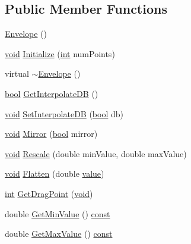 \subsection*{Public Member Functions}
\begin{DoxyCompactItemize}
\item 
\hyperlink{class_envelope_ac609dfa5fe79dd719530e8c29bb35725}{Envelope} ()
\item 
\hyperlink{sound_8c_ae35f5844602719cf66324f4de2a658b3}{void} \hyperlink{class_envelope_a558e8ecaf782edcef59c43fbb99e5235}{Initialize} (\hyperlink{xmltok_8h_a5a0d4a5641ce434f1d23533f2b2e6653}{int} num\+Points)
\item 
virtual \hyperlink{class_envelope_a0d854766d1fc084d27ddb7b6cf7967af}{$\sim$\+Envelope} ()
\item 
\hyperlink{mac_2config_2i386_2lib-src_2libsoxr_2soxr-config_8h_abb452686968e48b67397da5f97445f5b}{bool} \hyperlink{class_envelope_abd472dcf0eb0f885452a0cad1dae0696}{Get\+Interpolate\+DB} ()
\item 
\hyperlink{sound_8c_ae35f5844602719cf66324f4de2a658b3}{void} \hyperlink{class_envelope_ad2ed64914b2d02981f892b813c72707f}{Set\+Interpolate\+DB} (\hyperlink{mac_2config_2i386_2lib-src_2libsoxr_2soxr-config_8h_abb452686968e48b67397da5f97445f5b}{bool} db)
\item 
\hyperlink{sound_8c_ae35f5844602719cf66324f4de2a658b3}{void} \hyperlink{class_envelope_a8dec76fbda8fa4dafacd5053fcd21bfc}{Mirror} (\hyperlink{mac_2config_2i386_2lib-src_2libsoxr_2soxr-config_8h_abb452686968e48b67397da5f97445f5b}{bool} mirror)
\item 
\hyperlink{sound_8c_ae35f5844602719cf66324f4de2a658b3}{void} \hyperlink{class_envelope_a3c41e639b37089510d6e754ef5b44176}{Rescale} (double min\+Value, double max\+Value)
\item 
\hyperlink{sound_8c_ae35f5844602719cf66324f4de2a658b3}{void} \hyperlink{class_envelope_afd222aeb08ec8c091cf576b8bf0c7a3b}{Flatten} (double \hyperlink{lib_2expat_8h_a4a30a13b813682e68c5b689b45c65971}{value})
\item 
\hyperlink{xmltok_8h_a5a0d4a5641ce434f1d23533f2b2e6653}{int} \hyperlink{class_envelope_a2e71d43f9b2f683080c57e57fb93355c}{Get\+Drag\+Point} (\hyperlink{sound_8c_ae35f5844602719cf66324f4de2a658b3}{void})
\item 
double \hyperlink{class_envelope_ad5ddd2293653954e70ab48e02a3ee7a5}{Get\+Min\+Value} () \hyperlink{getopt1_8c_a2c212835823e3c54a8ab6d95c652660e}{const} 
\item 
double \hyperlink{class_envelope_a52926076ca223b39d682fd168e2a17fb}{Get\+Max\+Value} () \hyperlink{getopt1_8c_a2c212835823e3c54a8ab6d95c652660e}{const} 

\end{DoxyCompactItemize}
